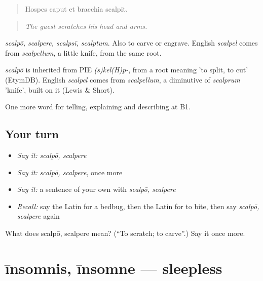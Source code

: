 \begin{quote}
Hospes caput et bracchia scalpit.
\end{quote}

\begin{quote}
\emph{The guest scratches his head and arms.}
\end{quote}

\emph{scalpō, scalpere, scalpsī, scalptum}. Also to carve or engrave. English \emph{scalpel} comes from \emph{scalpellum}, a little knife, from the same root.

\begin{cousinweb}
\emph{scalpō} is inherited from PIE \emph{(s)kel(H)p-}, from a root meaning 'to split, to cut' (EtymDB). English \emph{scalpel} comes from \emph{scalpellum}, a diminutive of \emph{scalprum} 'knife', built on it (Lewis \& Short).
\end{cousinweb}

\begin{grammarlens}[title={What you've built}]
One more word for telling, explaining and describing at B1.
\end{grammarlens}

\subsection*{Your turn}
\begin{itemize}
\raggedright
  \item \emph{Say it:} \emph{scalpō, scalpere}
  \item \emph{Say it:} \emph{scalpō, scalpere}, once more
  \item \emph{Say it:} a sentence of your own with \emph{scalpō, scalpere}
  \item \emph{Recall:} say the Latin for a bedbug, then the Latin for to bite, then say \emph{scalpō, scalpere} again
\end{itemize}

\begin{tcolorbox}[breakable,colback=teal!4,colframe=teal!35!black,title={Before you move on}]
What does scalpō, scalpere mean? (\textquotedblleft{}To scratch; to carve\textquotedblright{}.) Say it once more.
\end{tcolorbox}
\section[īnsomnis, īnsomne]{īnsomnis, īnsomne — sleepless}

\label{lesson:LA-C447-insomnis}



